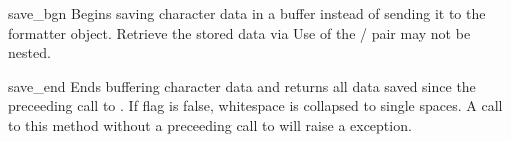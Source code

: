 \begin{funcdesc}{save_bgn}{}
Begins saving character data in a buffer instead of sending it to the
formatter object.  Retrieve the stored data via 
Use of the  /  pair may not be
nested.
\end{funcdesc}

\begin{funcdesc}{save_end}{}
Ends buffering character data and returns all data saved since the
preceeding call to .  If  flag is false,
whitespace is collapsed to single spaces.  A call to this method
without a preceeding call to  will raise a
 exception.
\end{funcdesc}

